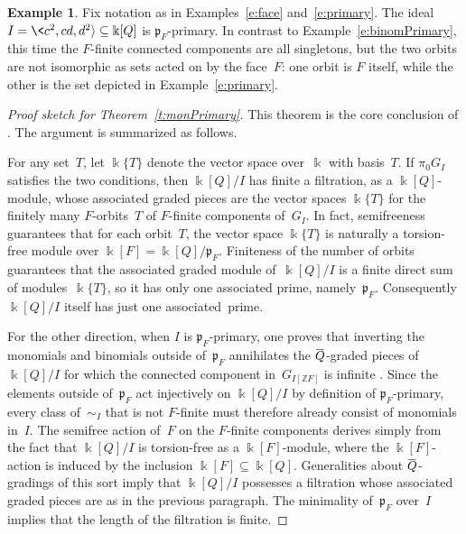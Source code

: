 \documentclass[12pt]{amsart}
\numberwithin{equation}{section}
\theoremstyle{definition}
\newtheorem{example}[thm]{Example}
\begin{document}
\begin{example}
Fix notation as in Examples~\ref{e:face} and~\ref{e:primary}.  The
ideal $I = \<c^2,cd,d^2{\rangle} \subseteq {\Bbbk}[Q]$ is ${\mathfrak{p}}_F$-primary.  In
contrast to Example~\ref{e:binomPrimary}, this time the $F$-finite
connected components are all singletons, but the two orbits are not
isomorphic as sets acted on by the face~$F$: one orbit is $F$ itself,
while the other is the set depicted in Example~\ref{e:primary}.
\end{example}

\begin{proof}[Proof sketch for Theorem~\ref{t:monPrimary}]
This theorem is the core conclusion of \cite[Theorem~2.15 and
Proposition~2.13]{primDecomp}.
The argument is summarized as follows.

For any set~$T$, let ${\Bbbk}\{T\}$ denote the vector space over~${\Bbbk}$
with basis~$T$.  If $\pi_0 G_I$ satisfies the two conditions, then
${\Bbbk}[Q]/I$ has finite a filtration, as a ${\Bbbk}[Q]$-module, whose
associated graded pieces are the vector spaces ${\Bbbk}\{T\}$ for the
finitely many $F$-orbits~$T$ of $F$-finite components of~$G_I$.  In
fact,
semifreeness guarantees that for each orbit~$T$, the vector space
${\Bbbk}\{T\}$ is naturally a torsion-free module over ${\Bbbk}[F] =
{\Bbbk}[Q]/{\mathfrak{p}}_F$.  Finiteness of the number of orbits guarantees that the
associated graded module of~${\Bbbk}[Q]/I$ is a finite direct sum of
modules~${\Bbbk}\{T\}$, so it has only one associated prime,
namely~${\mathfrak{p}}_F$.  Consequently ${\Bbbk}[Q]/I$ itself has just one
associated~prime.

For the other direction, when $I$ is ${\mathfrak{p}}_F$-primary, one proves that
inverting the monomials and binomials outside of~${\mathfrak{p}}_F$ annihilates
the ${\hspace{.15ex}{{\overline{{\hspace{-.15ex}Q\hspace{-.25ex}}}}{}}\hspace{.25ex}}$-graded pieces of ${\Bbbk}[Q]/I$ for which the connected
component in~$G_{I[{\mathbb{Z}} F]}$ is infinite \cite[Lemmas~2.9
and~2.10]{primDecomp}.  Since the elements outside of~${\mathfrak{p}}_F$ act
injectively on ${\Bbbk}[Q]/I$ by definition of ${\mathfrak{p}}_F$-primary,
\mbox{every} class of~${\mathord\sim}_I$ that is not $F$-finite must therefore
already consist of monomials in~$I$.  The semifree action of~$F$ on
the $F$-finite components derives simply from the fact that ${\Bbbk}[Q]/I$
is torsion-free as a ${\Bbbk}[F]$-module, where the ${\Bbbk}[F]$-action is
induced by the inclusion ${\Bbbk}[F] \subseteq {\Bbbk}[Q]$.  Generalities
about ${\hspace{.15ex}{{\overline{{\hspace{-.15ex}Q\hspace{-.25ex}}}}{}}\hspace{.25ex}}$-gradings of this sort imply that ${\Bbbk}[Q]/I$ possesses a
filtration whose associated graded pieces are as in the previous
paragraph.  The minimality of~${\mathfrak{p}}_F$ over~$I$ implies that the length
of the filtration is finite.
\end{proof}
\end{document}
